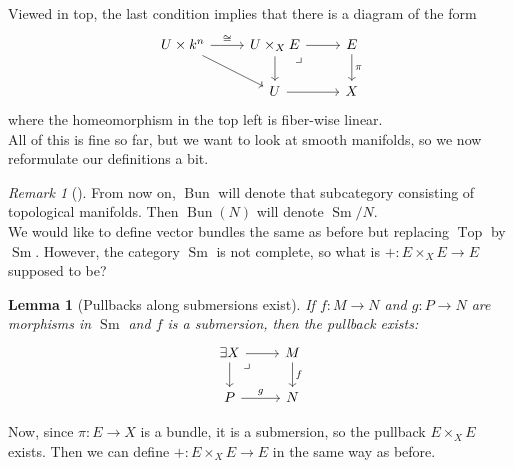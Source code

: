 \documentclass[reqno]{amsart}
\newtheorem{lemma}[theorem]{Lemma}
\theoremstyle{definition}
\theoremstyle{remark}
\newtheorem*{remark}{Remark}
\DeclareMathOperator{\Top}{Top}
\DeclareMathOperator{\Bun}{Bun}
\DeclareMathOperator{\Sm}{Sm}
\begin{document}
    Viewed in top, the last condition implies that there
    is a diagram of the form
    \begin{equation*}
    \begin{tikzcd}
        U \times k^{n} \ar[r, "\cong"] \ar[dr] & U \times_X E \ar[r]
        \ar[d] \ar[dr, phantom, "\lrcorner", very near start] & E
        \ar[d, "\pi"] \\
                                       & U \ar[r] & X
    \end{tikzcd}
    \end{equation*}
    where the homeomorphism in the top left
    is fiber-wise linear.\\
    \linebreak
    All of this is fine so far, but we want to look at
    smooth manifolds, so we now
    reformulate our definitions a bit. 
    \begin{remark}[]
        From now on, $\Bun$ will denote that
        subcategory consisting of
        topological manifolds.
        Then
        $\Bun (N)$ will denote
        $\Sm / N$.\\
        \linebreak
        We would like to define vector bundles
        the same as before but replacing
        $\Top$ by $\Sm$. However, the category
        $\Sm$ is not complete, so
        what is $+ \colon E \times_X E \to E$ supposed to be?
    \end{remark}

    \begin{lemma}[Pullbacks along submersions exist]
        If $f \colon M \to N$ and $g \colon P \to N$ are
        morphisms in $\Sm$ and $f$ is a submersion, then
        the pullback exists:
        \begin{equation*}
        \begin{tikzcd}
            \exists X \ar[r] \ar[d] 
            \ar[dr, phantom, "\lrcorner", very near start]
            & M \ar[d, "f"] \\
            P \ar[r, "g"] & N
        \end{tikzcd}
        \end{equation*}
    \end{lemma}

    Now, since $\pi \colon E \to X$ is a bundle, it is
    a submersion, so
    the pullback
    $E \times_X E$ exists. Then we can define
    $+ \colon E \times_X E \to E$ in the same way as
    before.
\end{document}
